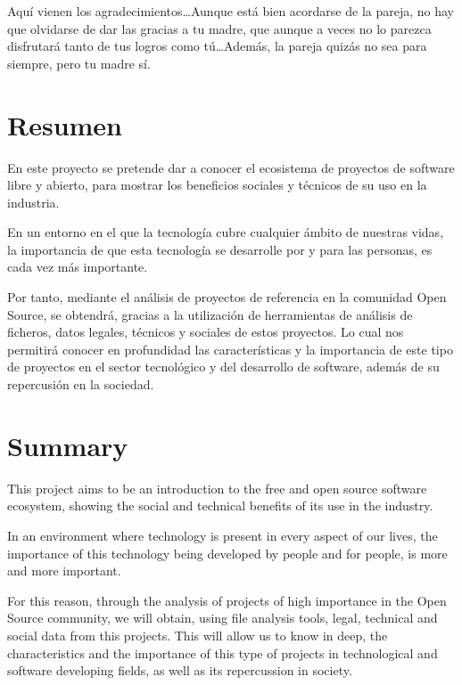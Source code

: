 \documentclass[a4paper, spanish, 12pt]{book}
\begin{document}
Aqu\'i vienen los agradecimientos\ldots Aunque est\'a bien acordarse de la pareja,
no hay que olvidarse de dar las gracias a tu madre, que aunque a veces no lo
parezca disfrutar\'a tanto de tus logros como t\'u\ldots Adem\'as, la pareja quiz\'as
no sea para siempre, pero tu madre s\'i.


\chapter*{Resumen}

En este proyecto se pretende dar a conocer el ecosistema de proyectos de software
libre y abierto, para mostrar los beneficios sociales y t\'ecnicos de su uso en la industria.\par
\vspace{0.3cm}
En un entorno en el que la tecnolog\'ia cubre cualquier \'ambito de nuestras vidas,
la importancia de que esta tecnolog\'ia se desarrolle por y para las personas, es
cada vez m\'as importante.\par
\vspace{0.3cm}
Por tanto, mediante el an\'alisis de proyectos de referencia en la comunidad Open Source,
se obtendr\'a, gracias a la utilizaci\'on de herramientas de an\'alisis de ficheros,
datos legales, t\'ecnicos y sociales de estos proyectos. Lo cual nos permitir\'a
conocer en profundidad las caracter\'isticas y la importancia de este tipo de
proyectos en el sector tecnol\'ogico y del desarrollo de software, adem\'as de
su repercusi\'on en la sociedad.


\chapter*{Summary}

This project aims to be an introduction to the free and open source software ecosystem,
showing the social and technical benefits of its use in the industry.\par
\vspace{0.3cm}
In an environment where technology is present in every aspect of our lives,
the importance of this technology being developed by people and for people, is
more and more important.\par
\vspace{0.3cm}
For this reason, through the analysis of projects of high importance in the Open
Source community, we will obtain, using file analysis tools, legal, technical and
social data from this projects. This will allow us to know in deep, the
characteristics and the importance of this type of projects in technological
and software developing fields, as well as its repercussion in society.
\end{document}
